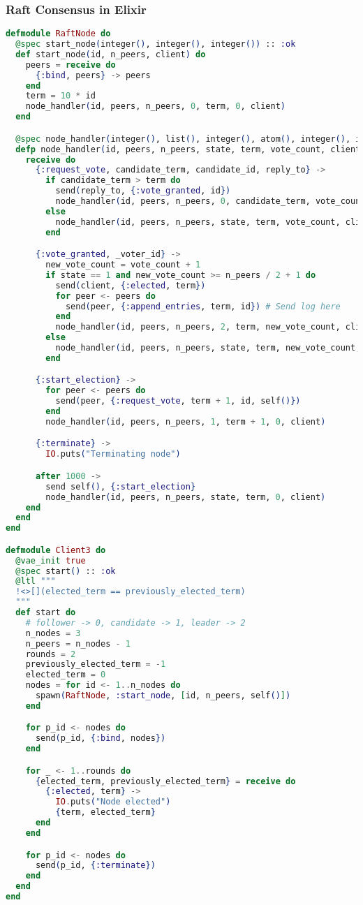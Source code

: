 \subsubsection{Raft Consensus in Elixir}
\begin{lstlisting}[language=Elixir, xleftmargin=.1\linewidth]
  defmodule RaftNode do
  @spec start_node(integer(), integer(), integer()) :: :ok
  def start_node(id, n_peers, client) do
    peers = receive do
      {:bind, peers} -> peers
    end
    term = 10 * id
    node_handler(id, peers, n_peers, 0, term, 0, client)
  end

  @spec node_handler(integer(), list(), integer(), atom(), integer(), integer(), integer()) :: :ok
  defp node_handler(id, peers, n_peers, state, term, vote_count, client) do
    receive do
      {:request_vote, candidate_term, candidate_id, reply_to} ->
        if candidate_term > term do
          send(reply_to, {:vote_granted, id})
          node_handler(id, peers, n_peers, 0, candidate_term, vote_count, client)
        else
          node_handler(id, peers, n_peers, state, term, vote_count, client)
        end

      {:vote_granted, _voter_id} ->
        new_vote_count = vote_count + 1
        if state == 1 and new_vote_count >= n_peers / 2 + 1 do
          send(client, {:elected, term})
          for peer <- peers do
            send(peer, {:append_entries, term, id}) # Send log here
          end
          node_handler(id, peers, n_peers, 2, term, new_vote_count, client)
        else
          node_handler(id, peers, n_peers, state, term, new_vote_count, client)
        end

      {:start_election} ->
        for peer <- peers do
          send(peer, {:request_vote, term + 1, id, self()})
        end
        node_handler(id, peers, n_peers, 1, term + 1, 0, client)

      {:terminate} ->
        IO.puts("Terminating node")

      after 1000 ->
        send self(), {:start_election}
        node_handler(id, peers, n_peers, state, term, 0, client)
    end
  end
end

defmodule Client3 do
  @vae_init true
  @spec start() :: :ok
  @ltl """
  !<>[](elected_term == previously_elected_term)
  """
  def start do
    # follower -> 0, candidate -> 1, leader -> 2
    n_nodes = 3
    n_peers = n_nodes - 1
    rounds = 2
    previously_elected_term = -1
    elected_term = 0
    nodes = for id <- 1..n_nodes do
      spawn(RaftNode, :start_node, [id, n_peers, self()])
    end

    for p_id <- nodes do
      send(p_id, {:bind, nodes})
    end

    for _ <- 1..rounds do
      {elected_term, previously_elected_term} = receive do
        {:elected, term} ->
          IO.puts("Node elected")
          {term, elected_term}
      end
    end

    for p_id <- nodes do
      send(p_id, {:terminate})
    end
  end
end
\end{lstlisting}